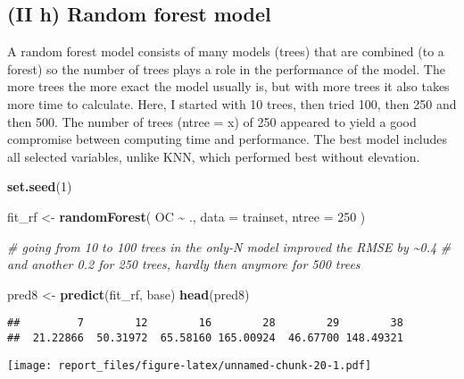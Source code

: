 \documentclass[
]{article}
\newenvironment{Shaded}{\begin{snugshade}}{\end{snugshade}}
\newcommand{\CommentTok}[1]{\textcolor[rgb]{0.56,0.35,0.01}{\textit{#1}}}
\newcommand{\DataTypeTok}[1]{\textcolor[rgb]{0.13,0.29,0.53}{#1}}
\newcommand{\DecValTok}[1]{\textcolor[rgb]{0.00,0.00,0.81}{#1}}
\newcommand{\KeywordTok}[1]{\textcolor[rgb]{0.13,0.29,0.53}{\textbf{#1}}}
\newcommand{\NormalTok}[1]{#1}
\newcommand{\OperatorTok}[1]{\textcolor[rgb]{0.81,0.36,0.00}{\textbf{#1}}}
\newcommand{\StringTok}[1]{\textcolor[rgb]{0.31,0.60,0.02}{#1}}
\begin{document}
\newpage

\hypertarget{ii-h-random-forest-model}{%
\subsection{(II h) Random forest model}\label{ii-h-random-forest-model}}

A random forest model consists of many models (trees) that are combined
(to a forest) so the number of trees plays a role in the performance of
the model. The more trees the more exact the model usually is, but with
more trees it also takes more time to calculate. Here, I started with 10
trees, then tried 100, then 250 and then 500. The number of trees (ntree
= x) of 250 appeared to yield a good compromise between computing time
and performance. The best model includes all selected variables, unlike
KNN, which performed best without elevation.

\begin{Shaded}
\begin{Highlighting}[]
\KeywordTok{set.seed}\NormalTok{(}\DecValTok{1}\NormalTok{)}

\NormalTok{fit\_rf <{-}}\StringTok{ }\KeywordTok{randomForest}\NormalTok{(}
\NormalTok{  OC }\OperatorTok{\textasciitilde{}}\StringTok{ }\NormalTok{., }\DataTypeTok{data =}\NormalTok{ trainset, }
  \DataTypeTok{ntree =} \DecValTok{250}
\NormalTok{)}

\CommentTok{\# going from 10 to 100 trees in the only{-}N model improved the RMSE by \textasciitilde{}0.4}
\CommentTok{\# and another 0.2 for 250 trees, hardly then anymore for 500 trees}

\NormalTok{pred8 <{-}}\StringTok{ }\KeywordTok{predict}\NormalTok{(fit\_rf, base)}
\KeywordTok{head}\NormalTok{(pred8)}
\end{Highlighting}
\end{Shaded}

\begin{verbatim}
##         7        12        16        28        29        38 
##  21.22866  50.31972  65.58160 165.00924  46.67700 148.49321
\end{verbatim}

\begin{Shaded}
\end{Shaded}

\texttt{[image: report\_files/figure-latex/unnamed-chunk-20-1.pdf]}
\end{document}
